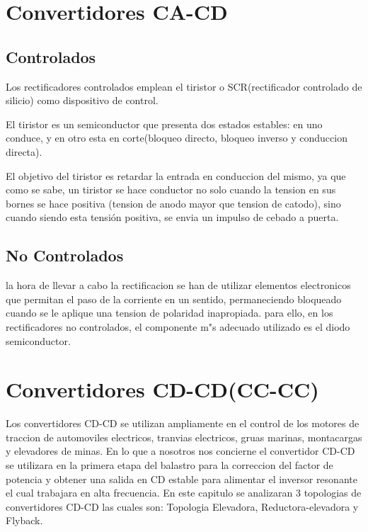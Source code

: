 \documentclass[11pt]{article}
\begin{document}
\section{Convertidores CA-CD}
\subsection{Controlados}
Los rectificadores controlados emplean el tiristor o SCR(rectificador controlado de silicio) como dispositivo de control.

El tiristor es un semiconductor que presenta dos estados estables: en uno conduce, y en otro esta en corte(bloqueo directo, bloqueo inverso y conduccion directa).

El objetivo del tiristor es retardar la entrada en conduccion del mismo, ya que como se sabe, un tiristor se hace conductor no solo cuando la tension en sus bornes se hace positiva (tension de anodo mayor que tension de catodo), sino cuando siendo esta tensión positiva, se envia un impulso de cebado a puerta.
\subsection{No Controlados}
la hora de llevar a cabo la rectificacion se han de utilizar elementos electronicos que permitan el paso de la corriente en un sentido, permaneciendo bloqueado cuando se le aplique una tension de polaridad inapropiada. para ello, en los rectificadores no controlados, el componente m"s adecuado utilizado es el diodo semiconductor.

\section{Convertidores CD-CD(CC-CC)}
Los convertidores CD-CD se utilizan  ampliamente en el control de los motores de traccion de automoviles electricos, tranvias electricos, gruas marinas, montacargas y elevadores de minas. En lo que a nosotros nos concierne el convertidor CD-CD se utilizara en la primera etapa del balastro  para  la  correccion  del  factor  de  potencia  y  obtener  una  salida  en  CD  estable  para  alimentar  el  inversor  resonante  el  cual  trabajara  en  alta  frecuencia.  En  este  capitulo  se  analizaran  3  topologias  de  convertidores  CD-CD  las  cuales  son:  Topologia  Elevadora,  Reductora-elevadora y Flyback.\\
\end{document}
